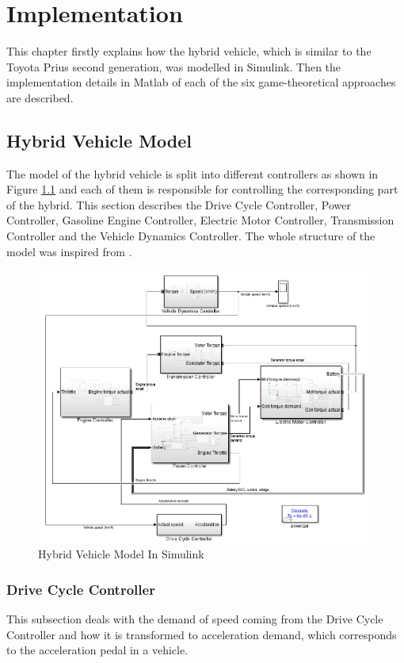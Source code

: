 \chapter{Implementation}
\label{chp:implementation}
This chapter firstly explains how the hybrid vehicle, which is similar to the Toyota Prius second generation, was modelled in Simulink. Then the implementation details in Matlab of each of the six game-theoretical approaches are described.

\section{Hybrid Vehicle Model}
The model of the hybrid vehicle is split into different controllers as shown in Figure \ref{fig:hev} and each of them is responsible for controlling the corresponding part of the hybrid. This section describes the Drive Cycle Controller, Power Controller, Gasoline Engine Controller, Electric Motor Controller, Transmission Controller and the Vehicle Dynamics Controller. The whole structure of the model was inspired from \citet{hevMatlab}.

\begin{figure}[h]
\centering
\includegraphics[scale=0.6]{figures/hev/hev}
\caption{Hybrid Vehicle Model In Simulink}
\label{fig:hev}
\end{figure}

\subsection{Drive Cycle Controller}
This subsection deals with the demand of speed coming from the Drive Cycle Controller and how it is transformed to acceleration demand, which corresponds to the acceleration pedal in a vehicle.

